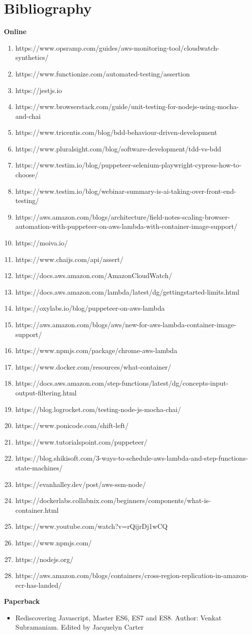 \documentclass[12pt,a4paper,titlepage]{report}
\begin{document}
\printbibliography[title={References}]

\chapter{Bibliography}
\textbf{Online}
\begin{enumerate}
\item https://www.opsramp.com/guides/aws-monitoring-tool/cloudwatch-synthetics/
\item https://www.functionize.com/automated-testing/assertion
\item https://jestjs.io
\item https://www.browserstack.com/guide/unit-testing-for-nodejs-using-mocha-and-chai
\item https://www.tricentis.com/blog/bdd-behaviour-driven-development
\item https://www.pluralsight.com/blog/software-development/tdd-vs-bdd
\item https://www.testim.io/blog/puppeteer-selenium-playwright-cypress-how-to-choose/
\item https://www.testim.io/blog/webinar-summary-is-ai-taking-over-front-end-testing/
\item https://aws.amazon.com/blogs/architecture/field-notes-scaling-browser-automation-with-puppeteer-on-aws-lambda-with-container-image-support/
\item https://moiva.io/
\item https://www.chaijs.com/api/assert/
\item https://docs.aws.amazon.com/AmazonCloudWatch/
\item https://docs.aws.amazon.com/lambda/latest/dg/gettingstarted-limits.html
\item https://oxylabs.io/blog/puppeteer-on-aws-lambda
\item https://aws.amazon.com/blogs/aws/new-for-aws-lambda-container-image-support/
\item https://www.npmjs.com/package/chrome-aws-lambda
\item https://www.docker.com/resources/what-container/
\item https://docs.aws.amazon.com/step-functions/latest/dg/concepts-input-output-filtering.html
\item https://blog.logrocket.com/testing-node-js-mocha-chai/
\item https://www.ponicode.com/shift-left/
\item https://www.tutorialspoint.com/puppeteer/
\item https://blog.shikisoft.com/3-ways-to-schedule-aws-lambda-and-step-functions-state-machines/
\item https://evanhalley.dev/post/aws-ssm-node/
\item https://dockerlabs.collabnix.com/beginners/components/what-is-container.html
\item https://www.youtube.com/watch?v=rQijrDj1wCQ
\item https://www.npmjs.com/
\item https://nodejs.org/
\item https://aws.amazon.com/blogs/containers/cross-region-replication-in-amazon-ecr-has-landed/
\end{enumerate}
\textbf{Paperback}
\begin{itemize}
  \item Rediscovering Javascript, Master ES6, ES7 and ES8. Author: Venkat Subramaniam. Edited by Jacquelyn Carter
\end{itemize}
\end{document}
